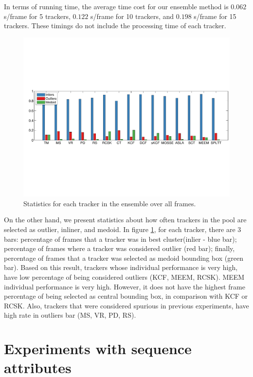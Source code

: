In terms of running time, the average time cost for our ensemble
method is $0.062$ s/frame for 5
trackers, $0.122$ s/frame for 10 trackers, and $0.198$ s/frame for 15 trackers.
These timings do not include the processing time of each tracker.

\begin{figure}[h!]
\centering
\includegraphics[width=1.0\linewidth, trim= 0.7cm 6.8cm 0.0cm 7.2cm, clip=true]{Figures/test.pdf}
\caption{\small Statistics for each tracker in the ensemble over all frames. }
\label{fig:stats}
\end{figure}

On the other hand, we present statistics about how often trackers in the pool
are selected as outlier, inliner, and medoid.
In figure
\ref{fig:stats}, for each tracker, there are 3 bars: percentage of frames that a
tracker was in best cluster(inlier - blue bar); percentage of frames where a
tracker was considered outlier (red bar); finally, percentage of frames that a
tracker was selected as medoid bounding box (green bar). Based on this result,
trackers whose individual performance is very high, have low percentage of being
considered outliers (KCF, MEEM, RCSK). MEEM individual performance is very high.
However, it does not have the highest frame percentage of being selected as
central bounding box, in comparison with KCF or RCSK. Also, trackers that were
considered spurious in previous experiments, have high rate in outliers bar
(MS, VR, PD, RS). 

\section{Experiments with sequence attributes}

